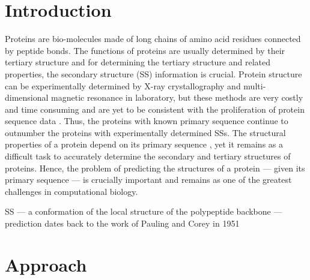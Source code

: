 \documentclass[11 pt, a4paper]{article}
\begin{document}
\begin{multicols}{2}
\section{Introduction}
Proteins are bio-molecules made of long chains of amino acid 
residues connected by peptide bonds. The functions of 
proteins are usually determined by their tertiary structure
and for determining the tertiary structure and related 
properties, the secondary structure (SS) information is
crucial. Protein structure can be experimentally determined by
X-ray crystallography and multi-dimensional magnetic 
resonance in laboratory, but these methods are very costly 
and time consuming and are yet to be consistent with the
proliferation of protein sequence data \cite{Jiang}. Thus, 
the proteins with known primary sequence continue to 
outnumber the proteins with experimentally determined SSs. 
The structural properties of a protein depend on its primary
sequence \cite{Anfinsen}, yet it remains as a difficult task
to accurately determine the secondary and tertiary structures
of proteins. Hence, the problem of predicting the structures
of a protein — given its primary sequence — is crucially
important and remains as one of the greatest challenges in 
computational biology.\par
SS — a conformation of the local
structure of the polypeptide backbone — prediction dates back
to the work of Pauling and Corey in 1951 \cite{Pauling}

\section{Approach}

\end{multicols}
\end{document}
